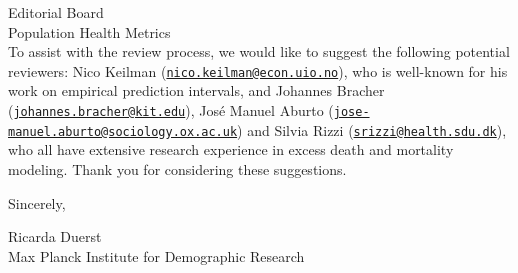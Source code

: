 \documentclass[a4paper,12pt]{letter}
\begin{document}
\begin{letter}{Editorial Board\\Population Health Metrics\\}
To assist with the review process, we would like to suggest the following potential reviewers: Nico Keilman (\href{mailto:nico.keilman@econ.uio.no}{\texttt{nico.keilman@econ.uio.no}}), who is well-known for his work on empirical prediction intervals, and Johannes Bracher (\href{mailto:johannes.bracher@kit.edu}{\texttt{johannes.bracher@kit.edu}}), José Manuel Aburto (\href{mailto:jose-manuel.aburto@sociology.ox.ac.uk}{\texttt{jose-manuel.aburto@sociology.ox.ac.uk}}) and Silvia Rizzi \linebreak (\href{mailto:srizzi@health.sdu.dk}{\texttt{srizzi@health.sdu.dk}}), who all have extensive research experience in excess death and mortality modeling. Thank you for considering these suggestions. 

Sincerely,

Ricarda Duerst\\
Max Planck Institute for Demographic Research

\end{letter}
\end{document}
